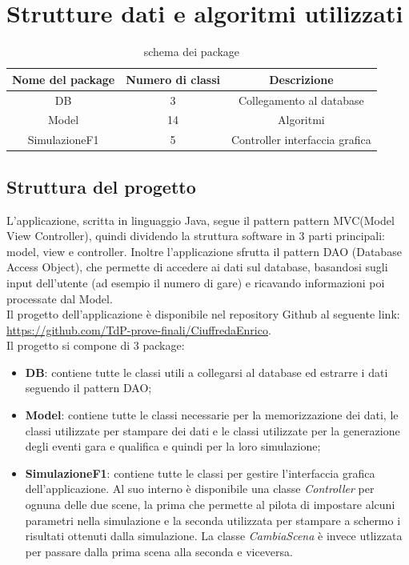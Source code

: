 \chapter{Strutture dati e algoritmi utilizzati}
\label{sec:strutture dati e algoritmi utilizzati}

\begin{table}[]
    \centering
    \setcellgapes{3pt}
    \makegapedcells
    \begin{tabular}{|c|c|c|}
    \hline
    \textbf{Nome del package} & \textbf{Numero di classi} & \textbf{Descrizione}\\ \hline
    DB & 3 & Collegamento al database\\ \hline
    Model & 14 & Algoritmi\\ \hline
    SimulazioneF1 & 5 & Controller interfaccia grafica\\ \hline
    \end{tabular}
    \caption{schema dei package}
    \label{tab:schema dei package}
\end{table}
\section[Struttura del progetto]{Struttura del progetto} %
L'applicazione, scritta in linguaggio Java, segue il pattern  pattern MVC(Model View Controller), quindi dividendo la struttura software in 3 parti principali: model, view e controller. Inoltre l'applicazione sfrutta il pattern DAO (Database Access Object), che permette di accedere ai dati sul database, basandosi sugli input dell'utente (ad esempio il numero di gare) e ricavando informazioni poi processate dal Model.\\
Il progetto dell'applicazione è disponibile nel repository Github al seguente link: \href{https://github.com/TdP-prove-finali/CiuffredaEnrico}{https://github.com/TdP-prove-finali/CiuffredaEnrico}.\\
Il progetto si compone di 3 package:
\begin{itemize}

    \item\textbf{ DB}: contiene tutte le classi utili a collegarsi al database ed estrarre i dati seguendo il pattern DAO;
    \item \textbf{Model}: contiene tutte le classi necessarie per la memorizzazione dei dati, le classi utilizzate per stampare dei dati e le classi utilizzate per la generazione degli eventi gara e qualifica e quindi per la loro simulazione;
    \item \textbf{SimulazioneF1}: contiene tutte le classi per gestire l'interfaccia grafica dell'applicazione. Al suo interno è disponibile una classe \textit{Controller} per ognuna delle due scene, la prima che permette al pilota di impostare alcuni parametri nella simulazione e la seconda utilizzata per stampare a schermo i risultati ottenuti dalla simulazione. La classe \textit{CambiaScena} è invece utlizzata per passare dalla prima scena alla seconda e viceversa.
\end{itemize}
